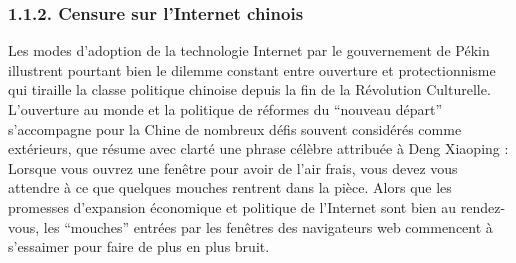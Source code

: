 \subsubsection[1.1.2. Censure sur l{}'Internet chinois]{1.1.2. Censure sur l'Internet chinois}
\hypertarget{RefHeading71699228146}{}{\color{black}
Les modes d'adoption de la technologie Internet par le gouvernement de P\'ekin illustrent pourtant bien le dilemme
constant entre ouverture et protectionnisme qui tiraille la classe politique chinoise depuis la fin de la R\'evolution
Culturelle. L'ouverture au monde et la politique de r\'eformes du ``nouveau d\'epart'' s'accompagne pour la Chine de
nombreux d\'efis souvent consid\'er\'es comme ext\'erieurs, que r\'esume avec clart\'e une phrase c\'el\`ebre
attribu\'ee \`a Deng Xiaoping : {\textquotedbl}Lorsque vous ouvrez une fen\^etre pour avoir de l'air frais, vous devez
vous attendre \`a ce que quelques mouches rentrent dans la pi\`ece.{\textquotedbl} Alors que les promesses d'expansion
\'economique et politique de l'Internet sont bien au rendez-vous, les ``mouches'' entr\'ees par les fen\^etres des
navigateurs web commencent \`a s'essaimer pour faire de plus en plus bruit. }


\bigskip

